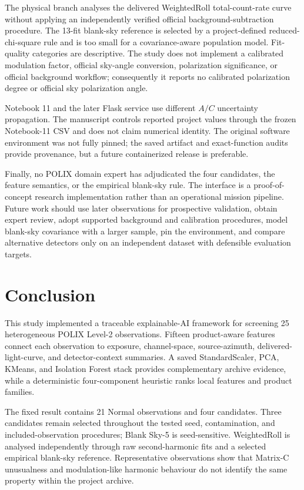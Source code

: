 \documentclass[conference]{IEEEtran}
\begin{document}
The physical branch analyses the delivered WeightedRoll total-count-rate curve without applying an independently verified official background-subtraction procedure. The 13-fit blank-sky reference is selected by a project-defined reduced-chi-square rule and is too small for a covariance-aware population model. Fit-quality categories are descriptive. The study does not implement a calibrated modulation factor, official sky-angle conversion, polarization significance, or official background workflow; consequently it reports no calibrated polarization degree or official sky polarization angle.


Notebook 11 and the later Flask service use different $A/C$ uncertainty propagation. The manuscript controls reported project values through the frozen Notebook-11 CSV and does not claim numerical identity. The original software environment was not fully pinned; the saved artifact and exact-function audits provide provenance, but a future containerized release is preferable.


Finally, no POLIX domain expert has adjudicated the four candidates, the feature semantics, or the empirical blank-sky rule. The interface is a proof-of-concept research implementation rather than an operational mission pipeline. Future work should use later observations for prospective validation, obtain expert review, adopt supported background and calibration procedures, model blank-sky covariance with a larger sample, pin the environment, and compare alternative detectors only on an independent dataset with defensible evaluation targets.


\section{Conclusion}

This study implemented a traceable explainable-AI framework for screening 25 heterogeneous POLIX Level-2 observations. Fifteen product-aware features connect each observation to exposure, channel-space, source-azimuth, delivered-light-curve, and detector-context summaries. A saved StandardScaler, PCA, KMeans, and Isolation Forest stack provides complementary archive evidence, while a deterministic four-component heuristic ranks local features and product families.


The fixed result contains 21 Normal observations and four candidates. Three candidates remain selected throughout the tested seed, contamination, and included-observation procedures; Blank Sky-5 is seed-sensitive. WeightedRoll is analysed independently through raw second-harmonic fits and a selected empirical blank-sky reference. Representative observations show that Matrix-C unusualness and modulation-like harmonic behaviour do not identify the same property within the project archive.
\end{document}
